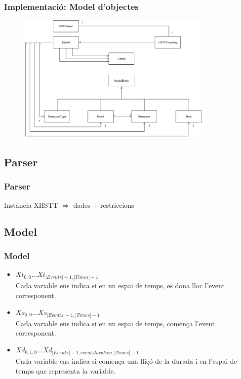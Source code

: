 \documentclass[11pt]{beamer}
\begin{document}
  \begin{frame}
    \frametitle{Implementació: Model d'objectes}
    \begin{figure}[p]
      \includegraphics[width=0.85\textwidth]{Diagrames/UMLKai.png}
      \label{fig:procs}
    \end{figure}
  \end{frame}


  
  \subsection{Parser}
  
  \begin{frame}[fragile]
    \frametitle{Parser}

    
    Instància XHSTT $\Rightarrow$ dades + restriccions


  \end{frame}

  \subsection{Model}
   
  \begin{frame}
    \frametitle{Model}

    \begin{itemize}
      \item $Xt_{0,0} . . . Xt_{|Events|-1,|Times|-1}$\\Cada variable ens indica si en un espai de temps, es dona lloc l'event corresponent.
      \item $Xs_{0,0} . . . Xs_{|Events|-1,|Times|-1}$\\Cada variable ens indica si en un espai de temps, comença l'event corresponent.
      \item $Xd_{0,1,0} . . . Xd_{|Events|-1, event.duration, |Times|-1}$\\ 
      Cada variable ens indica si comença una lliçó de la durada i en l'espai de temps que representa la variable. 
    \end{itemize}
  \end{frame}
\end{document}
